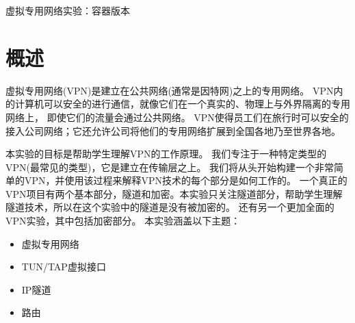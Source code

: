 
\newcommand{\commonfolder}{../../common-files}



\newcommand{\vpnFigs}{./Figs}




\setcounter{task}{1}
\newcommand{\mytask}{\bf {\noindent \arabic{task}} \addtocounter{task}{1} \,}



\begin{center}
{\LARGE 虚拟专用网络实验：容器版本}
\end{center}



\section{概述}

虚拟专用网络(VPN)是建立在公共网络(通常是因特网)之上的专用网络。
VPN内的计算机可以安全的进行通信，就像它们在一个真实的、物理上与外界隔离的专用网络上，
即使它们的流量会通过公共网络。
VPN使得员工们在旅行时可以安全的接入公司网络；它还允许公司将他们的专用网络扩展到全国各地乃至世界各地。


本实验的目标是帮助学生理解VPN的工作原理。
我们专注于一种特定类型的VPN(最常见的类型)，它是建立在传输层之上。
我们将从头开始构建一个非常简单的VPN，并使用该过程来解释VPN技术的每个部分是如何工作的。
一个真正的VPN项目有两个基本部分，隧道和加密。本实验只关注隧道部分，帮助学生理解隧道技术，所以在这个实验中的隧道是没有被加密的。
还有另一个更加全面的VPN实验，其中包括加密部分。
本实验涵盖以下主题：

\begin{itemize}[noitemsep]
\item 虚拟专用网络
\item TUN/TAP虚拟接口
\item IP隧道
\item 路由
\end{itemize}


